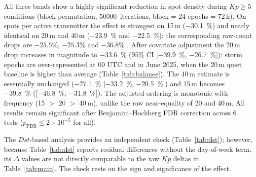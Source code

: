 \documentclass{agujournal2019}
\providecommand{\DIFaddtex}[1]{{\protect\color{blue}\uwave{#1}}} %
\providecommand{\DIFaddbegin}{} %
\providecommand{\DIFaddend}{} %
\providecommand{\DIFadd}[1]{\texorpdfstring{\DIFaddtex{#1}}{#1}} %
\providecommand{\DIFaddincludegraphics}[2][]{{\color{blue}\fbox{\DIFOincludegraphics[#1]{#2}}}} %
\DeclareRobustCommand{\DIFaddbegin}{\DIFOaddbegin \let\includegraphics\DIFaddincludegraphics} %
\DeclareRobustCommand{\DIFaddend}{\DIFOaddend \let\includegraphics\DIFOincludegraphics} %
\begin{document}
All three bands show a highly significant reduction in spot density during
$Kp \ge 5$ conditions (block permutation, \SI{50000}{iterations},
block = 24 epochs = 72\,h). On spots per active transmitter the
effect is strongest on 15\,m (\SI{-30.1}{\percent}) and nearly
identical on 20\,m and 40\,m (\SI{-23.9}{\percent} and
\SI{-22.5}{\percent}); the corresponding raw-count drops are
$-25.5$\%, $-25.3$\% and $-36.8$\% \DIFaddbegin \DIFadd{(flare-free, 169 epochs)}\DIFaddend . After covariate
adjustment the 20\,m drop increases in magnitude to \SI{-33.6}{\percent}
(95\% CI [\SI{-39.9}{\percent}, \SI{-26.7}{\percent}]): storm epochs are
over-represented at 00 UTC and in June 2025, when the 20\,m quiet baseline is
higher than average (Table~\ref{tab:balance}). The 40\,m estimate is
essentially unchanged (\SI{-27.1}{\percent}
[\SI{-33.2}{\percent}, \SI{-20.5}{\percent}]) and 15\,m becomes
\SI{-39.8}{\percent} ([\SI{-46.8}{\percent}, \SI{-31.8}{\percent}]). The
adjusted ordering is monotonic with frequency (15 $>$ 20 $>$ 40\,m), unlike
the raw near-equality of 20 and 40\,m. All results remain significant after
Benjamini--Hochberg FDR correction across 6 tests
($p_{\text{FDR}} \le 2 \times 10^{-5}$ for all).

The $Dst$-based analysis provides an independent check
(Table~\ref{tab:dst}); however, because Table~\ref{tab:dst} reports
residual differences without the day-of-week term, its $\Delta$ values are
not directly comparable to the raw $Kp$ deltas in Table~\ref{tab:main}. The
check rests on the sign and significance of the effect.
\end{document}

